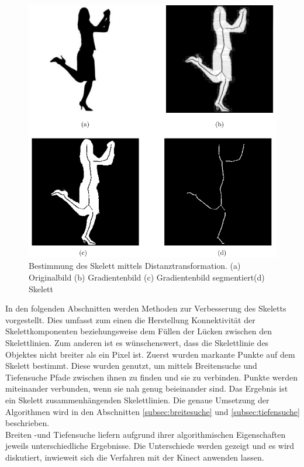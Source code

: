 \begin{figure}[htbp]
\centering
\includegraphics[width=1.0\linewidth]{./fig/person_gradienten_problem.pdf}
\caption{Bestimmung des Skelett mittels Distanztransformation. (a) Originalbild (b) Gradientenbild (c) Gradientenbild segmentiert(d) Skelett}
\label{fig:person-skelett}
\end{figure}
In den folgenden Abschnitten werden Methoden zur Verbesserung des Skeletts vorgestellt. Dies umfasst zum einen die Herstellung Konnektivität der Skelettkomponenten beziehungsweise dem Füllen der Lücken zwischen den Skelettlinien. Zum anderen ist es wünschenswert, dass die Skelettlinie des Objektes nicht breiter als ein Pixel ist. Zuerst wurden markante Punkte auf dem Skelett bestimmt. Diese wurden
genutzt, um mittels Breitensuche und Tiefensuche Pfade zwischen ihnen zu finden und sie zu verbinden. Punkte werden miteinander
verbunden, wenn sie nah genug beieinander sind. Das Ergebnis ist ein Skelett
zusammenhängenden Skelettlinien. Die genaue Umsetzung der Algorithmen wird in den Abschnitten \ref{subsec:breitesuche} und \ref{subsec:tiefensuche} beschrieben.\\
Breiten -und Tiefensuche liefern aufgrund ihrer algorithmischen Eigenschaften jeweils unterschiedliche Ergebnisse. Die Unterschiede werden gezeigt und es wird diskutiert, inwieweit sich die Verfahren mit der Kinect anwenden lassen. 
\newpage

